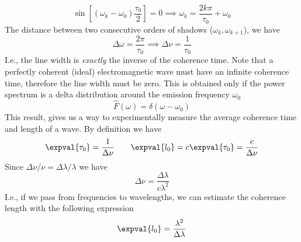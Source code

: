 \documentclass[../electromagnetism.tex]{subfiles}
\begin{document}
\begin{equation*}
	\sin\left[ (\omega_k-\omega_0)\frac{\tau_0}{2} \right]=0\implies\omega_k=\frac{2k\pi}{\tau_0}+\omega_0
\end{equation*}
The distance between two consecutive orders of shadows ($\omega_k, \omega_{k+1}$), we have
\begin{equation}
	\Delta\omega=\frac{2\pi}{\tau_0}\implies\Delta\nu=\frac{1}{\tau_0}
	\label{eq:linewidth.cfc}
\end{equation}
I.e., the line width is \textit{exactly} the inverse of the coherence time. Note that a perfectly coherent (ideal) electromagnetic wave must have an infinite coherence time, therefore the line width must be zero. This is obtained only if the power spectrum is a delta distribution around the emission frequency $\omega_0$
\begin{equation*}
	\hat{F}(\omega)=\delta\left( \omega-\omega_0 \right)
\end{equation*}
This result, gives us a way to experimentally measure the average coherence time and length of a wave. By definition we have
\begin{equation}
	\expval{\tau_0}=\frac{1}{\Delta\nu}\qquad\expval{l_0}=c\expval{\tau_0}=\frac{c}{\Delta\nu}
	\label{eq:expectedcoherencetimelenght.cfc}
\end{equation}
Since $\Delta\nu/\nu=\Delta\lambda/\lambda$ we have
\begin{equation*}
	\Delta\nu=\frac{\Delta\lambda}{c\lambda^2}
\end{equation*}
I.e., if we pass from frequencies to wavelengths, we can estimate the coherence length with the following expression
\begin{equation}
	\expval{l_0}=\frac{\lambda^2}{\Delta\lambda}
	\label{eq:coherencelength.cfc}
\end{equation}
\end{document}
